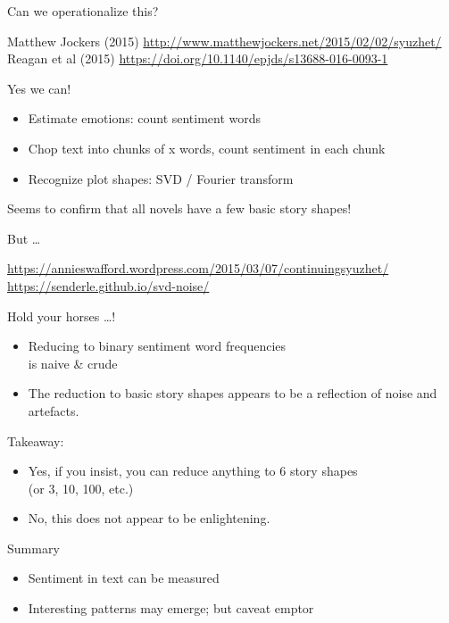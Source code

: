 \documentclass[aspectratio=169,usenames,dvipsnames]{beamer}
\begin{document}
\begin{frame}{Can we operationalize this?}
    \begin{reference}
        Matthew Jockers (2015) \url{http://www.matthewjockers.net/2015/02/02/syuzhet/}
        Reagan et al (2015) \url{https://doi.org/10.1140/epjds/s13688-016-0093-1}
    \end{reference}
    Yes we can!
    \begin{itemize}
        \item Estimate emotions: count sentiment words
        \item Chop text into chunks of x words, count sentiment in each chunk
        \item Recognize plot shapes: SVD / Fourier transform
    \end{itemize}
    Seems to confirm that all novels have a few basic story shapes!
\end{frame}

\begin{frame}{But \dots}
    \begin{reference}
        \url{https://annieswafford.wordpress.com/2015/03/07/continuingsyuzhet/} \\
        \url{https://senderle.github.io/svd-noise/}
    \end{reference}
    Hold your horses \dots !

    \begin{itemize}
        \item Reducing  to binary sentiment word frequencies \\
            is naive \& crude
        \item The reduction to basic story shapes appears to be a reflection of
            noise and artefacts.
    \end{itemize}

    \pause
    Takeaway:
    \begin{itemize}
        \item Yes, if you insist, you can reduce anything to 6 story shapes \\
            (or 3, 10, 100, etc.)
        \item No, this does not appear to be enlightening.
    \end{itemize}
\end{frame}

\begin{frame}{Summary}
    \begin{itemize}
        \item Sentiment in text can be measured
        \item Interesting patterns may emerge; but caveat emptor
    \end{itemize}
\end{frame}
\end{document}
